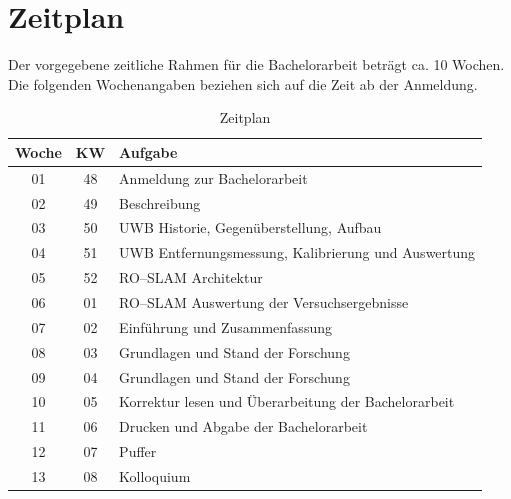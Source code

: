 \documentclass[12pt]{article}
\begin{document}
%
%
\section{Zeitplan}
Der vorgegebene zeitliche Rahmen für die Bachelorarbeit beträgt ca. 10 Wochen. Die folgenden Wochenangaben beziehen sich auf die Zeit ab der Anmeldung.

\begin{table}[h!]
	\centering
	\begin{tabular}{||c|c||l||}
		\hline
		Woche & KW & Aufgabe\\	\hline\hline
		01 & 48 & Anmeldung zur Bachelorarbeit\\\hline
		02 & 49 & Beschreibung \\\hline
		03 & 50 & UWB Historie, Gegenüberstellung, Aufbau\\\hline
		04 & 51 & UWB Entfernungsmessung, Kalibrierung und Auswertung\\\hline
		05 & 52 & RO--SLAM Architektur\\\hline
		06 & 01 & RO--SLAM Auswertung der Versuchsergebnisse\\\hline
		07 & 02 & Einführung und Zusammenfassung\\\hline
		08 & 03 & Grundlagen und Stand der Forschung\\\hline
		09 & 04 & Grundlagen und Stand der Forschung\\\hline
		10 & 05 & Korrektur lesen und Überarbeitung der Bachelorarbeit\\\hline\hline
		11 & 06 & Drucken und Abgabe der Bachelorarbeit\\\hline
		12 & 07 & Puffer \\\hline
		13 & 08 & Kolloquium \\\hline
	\end{tabular}
	\caption{Zeitplan}
	\label{table:zeitplan}
\end{table}


%
\newpage
\nocite{mcelroy2014comparison}
\nocite{herranz2014comparison}
\nocite{gonzalez2009mobile}
\nocite{durrant2006simultaneous}
\nocite{thrun2005probabilistic}
\nocite{schroeder2005low}
\nocite{smith2004tracking}
\printbibliography[heading=bibnumbered]
\end{document}

